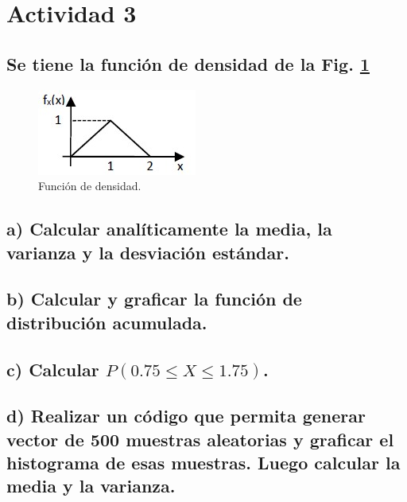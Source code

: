 \section{Actividad 3}

\subsection*{Se tiene la función de densidad de la Fig. \ref{fig:diagrama_3}}

    \begin{figure}[H]
        \centering
        \includegraphics[width=0.3\linewidth]{imagenes/Actividad_3/actividad_3.jpg}
        \caption{Función de densidad.}
        \label{fig:diagrama_3}
    \end{figure}

\subsection*{a) Calcular analíticamente la media, la varianza y la desviación estándar.}


\subsection*{b) Calcular y graficar la función de distribución acumulada.}


\subsection*{c) Calcular \( P(0.75 \leq X \leq 1.75) \).}


\subsection*{d) Realizar un código que permita generar vector de 500 muestras aleatorias y graficar el histograma de esas muestras. Luego calcular la media 
y la varianza.}
